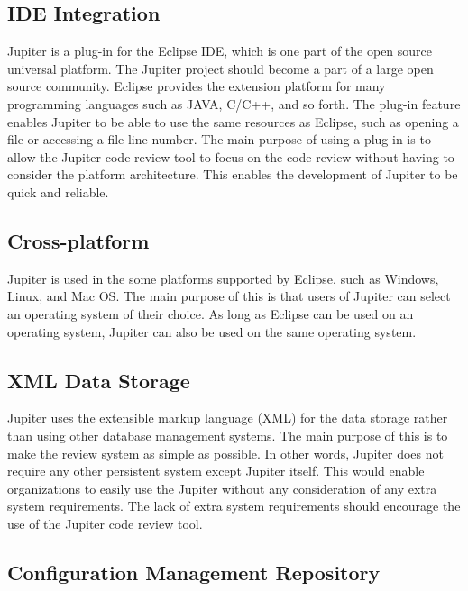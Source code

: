 \subsection{IDE Integration}
\label{subsec:ide-integration}

Jupiter is a plug-in for the Eclipse IDE, which is one part of the open source universal platform. The Jupiter project should become a part of a large open source community. Eclipse provides the extension platform for many programming languages such as JAVA, C/C++, and so forth. The plug-in feature enables Jupiter to be able to use the same resources as Eclipse, such as opening a file or accessing a file line number. The main purpose of using a plug-in is to allow the Jupiter code review tool to focus on the code review without having to consider the platform architecture. This enables the development of Jupiter to be quick and reliable.

\subsection{Cross-platform}
\label{subsec:cross-platform}

Jupiter is used in the some platforms supported by Eclipse, such as Windows, Linux, and Mac OS. The main purpose of this is that users of Jupiter can select an operating system of their choice. As long as Eclipse can be used on an operating system, Jupiter can also be used on the same operating system.

\subsection{XML Data Storage}
\label{subsec:xml-data-storage}

Jupiter uses the extensible markup language (XML) for the data storage rather than using other database management systems. The main purpose of this is to make the review system as simple as possible. In other words, Jupiter does not require any other persistent system except Jupiter itself. This would enable organizations to easily use the Jupiter without any consideration of any extra system requirements. The lack of extra system requirements should encourage the use of the Jupiter code review tool.

\subsection{Configuration Management Repository}
\label{subsec:configuration-management-repository}

